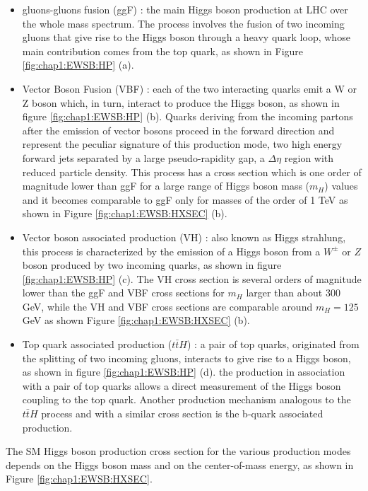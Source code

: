 \begin{itemize}
	\item gluons-gluons fusion (ggF) : the main Higgs boson production at LHC over the whole mass spectrum. The process involves the fusion of two incoming gluons that give rise to the Higgs boson through a heavy quark loop, whose main contribution comes from the top quark, as shown in Figure \ref{fig:chap1:EWSB:HP} (a).  
	\item Vector Boson Fusion (VBF) : each of the two interacting quarks emit a W or Z boson which, in turn, interact to produce the Higgs boson, as shown in figure \ref{fig:chap1:EWSB:HP} (b). Quarks deriving from the incoming partons after the emission of vector bosons proceed in the forward direction and represent the peculiar signature of this production mode, two high energy forward jets separated by a large pseudo-rapidity gap, a $\Delta\eta$ region with reduced particle density. This process has a cross section which is one order of magnitude lower than ggF for a large range of Higgs boson mass ($m_H$) values and it becomes comparable to ggF only for masses of the order of 1 TeV as shown in Figure \ref{fig:chap1:EWSB:HXSEC} (b).
	\item Vector boson associated production (VH) : also known as Higgs strahlung, this process is characterized by the emission of a Higgs boson from a $W^{\pm}$ or $Z$ boson produced by two incoming quarks, as shown in figure \ref{fig:chap1:EWSB:HP} (c). The VH cross section is several orders of magnitude lower than the ggF and VBF cross sections for $m_H$ larger than about 300 GeV, while the VH and VBF cross sections are comparable around $m_H = 125$ GeV as shown Figure \ref{fig:chap1:EWSB:HXSEC} (b).
	\item Top quark associated production ($t\bar{t}H$) : a pair of top quarks, originated from the splitting of two incoming gluons, interacts to give rise to a Higgs boson, as shown in figure \ref{fig:chap1:EWSB:HP} (d). the production in association with a pair of top quarks allows a direct measurement of the Higgs boson coupling to the top quark. Another production mechanism analogous to the $t\bar{t}H$ process and with a similar cross section is the b-quark associated production.
\end{itemize}
The SM Higgs boson production cross section for the various production modes depends on the Higgs boson mass and on the center-of-mass energy, as shown in Figure \ref{fig:chap1:EWSB:HXSEC}.  
